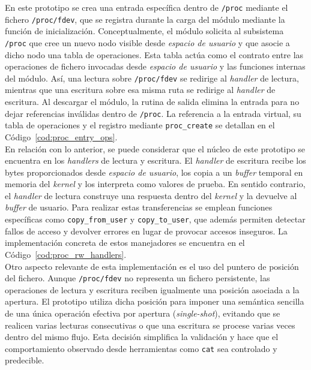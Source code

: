 En este prototipo se crea una entrada específica dentro de \texttt{/proc} mediante el fichero \texttt{/proc/fdev}, que se registra durante la carga del módulo mediante la función de inicialización.
Conceptualmente, el módulo solicita al subsistema \texttt{/proc} que cree un nuevo nodo visible desde \textit{espacio de usuario} y que asocie a dicho nodo una tabla de operaciones.
Esta tabla actúa como el contrato entre las operaciones de fichero invocadas desde \textit{espacio de usuario} y las funciones internas del módulo.
Así, una lectura sobre \texttt{/proc/fdev} se redirige al \textit{handler} de lectura, mientras que una escritura sobre esa misma ruta se redirige al \textit{handler} de escritura.
Al descargar el módulo, la rutina de salida elimina la entrada para no dejar referencias inválidas dentro de \texttt{/proc}.
La referencia a la entrada virtual, su tabla de operaciones y el registro mediante \texttt{proc\_create} se detallan en el Código~\ref{cod:proc_entry_ops}.\\

En relación con lo anterior, se puede considerar que el núcleo de este prototipo se encuentra en los \textit{handlers} de lectura y escritura.
El \textit{handler} de escritura recibe los bytes proporcionados desde \textit{espacio de usuario}, los copia a un \textit{buffer} temporal en memoria del \textit{kernel} y los interpreta como valores de prueba.
En sentido contrario, el \textit{handler} de lectura construye una respuesta dentro del \textit{kernel} y la devuelve al \textit{buffer} de usuario.
Para realizar estas transferencias se emplean funciones específicas como \texttt{copy\_from\_user} y \texttt{copy\_to\_user}, que además permiten detectar fallos de acceso y devolver errores en lugar de provocar accesos inseguros.
La implementación concreta de estos manejadores se encuentra en el Código~\ref{cod:proc_rw_handlers}.\\

Otro aspecto relevante de esta implementación es el uso del puntero de posición del fichero.
Aunque \texttt{/proc/fdev} no representa un fichero persistente, las operaciones de lectura y escritura reciben igualmente una posición asociada a la apertura.
El prototipo utiliza dicha posición para imponer una semántica sencilla de una única operación efectiva por apertura (\textit{single-shot}), evitando que se realicen varias lecturas consecutivas o que una escritura se procese varias veces dentro del mismo flujo.
Esta decisión simplifica la validación y hace que el comportamiento observado desde herramientas como \texttt{cat} sea controlado y predecible.\\


